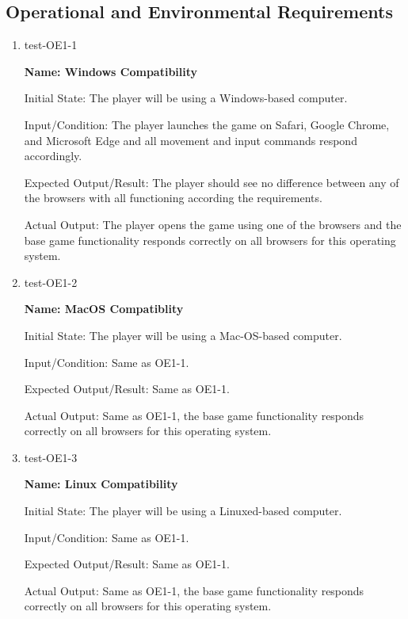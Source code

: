 \documentclass[12pt, titlepage]{article}
\begin{document}
\subsection{Operational and Environmental Requirements}

\begin{enumerate}

\item{test-OE1-1\\}

\textbf{Name: Windows Compatibility}
					
Initial State: The player will be using a Windows-based computer.
					
Input/Condition: The player launches the game on Safari, Google Chrome, and Microsoft Edge and all movement and input commands respond accordingly.
					
Expected Output/Result: The player should see no difference between any of the browsers with all functioning according the requirements. 

Actual Output: The player opens the game using one of the browsers and the base game functionality responds correctly on all browsers for this operating system. 

\item{test-OE1-2\\}

\textbf{Name: MacOS Compatiblity}
					
Initial State: The player will be using a Mac-OS-based computer.
					
Input/Condition: Same as OE1-1.
					
Expected Output/Result: Same as OE1-1.

Actual Output: Same as OE1-1, the base game functionality responds correctly on all browsers for this operating system. 

\item{test-OE1-3\\}

\textbf{Name: Linux Compatibility}
					
Initial State: The player will be using a Linuxed-based computer.
					
Input/Condition: Same as OE1-1.
					
Expected Output/Result: Same as OE1-1.

Actual Output: Same as OE1-1, the base game functionality responds correctly on all browsers for this operating system. 
				
\end{enumerate}
\end{document}
